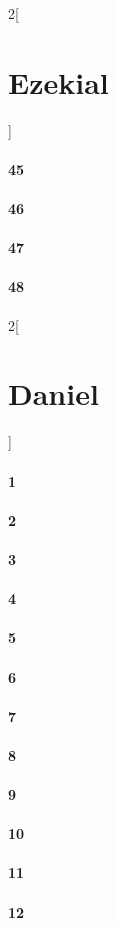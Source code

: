 \documentclass{book}
\begin{document}
\begin{multicols}{2}[\part{Ezekial}]
\subsection*{45}
\subsection*{46}
\subsection*{47}
\subsection*{48}
\end{multicols}
\begin{multicols}{2}[\part{Daniel}]
\subsection*{1}
\subsection*{2}
\subsection*{3}
\subsection*{4}
\subsection*{5}
\subsection*{6}
\subsection*{7}
\subsection*{8}
\subsection*{9}
\subsection*{10}
\subsection*{11}
\subsection*{12}
\end{multicols}
\end{document}

